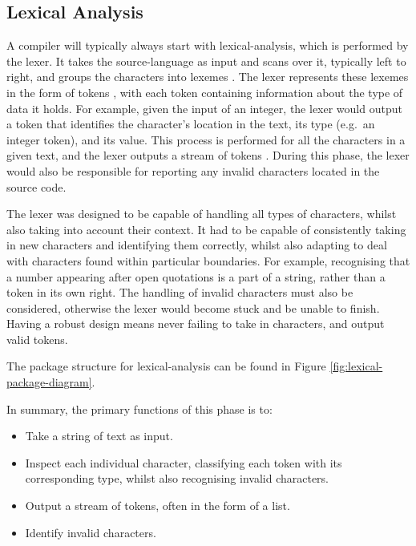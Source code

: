 \documentclass[
]{report}
\begin{document}
\subsection{Lexical Analysis}
A compiler will typically always start with \gls{lexical-analysis}, which is
performed by the lexer. It takes the \gls{source-language} as input and scans over
it, typically left to right, and groups the characters into \glspl{lexeme}
\cite{guru99-website}. The lexer represents these \glspl{lexeme} in the form of \glspl{token}
\cite{tutorials-guide}, with each \gls{token} containing information about the type of data
it holds. For example, given the input of an integer, the lexer would
output a \gls{token} that identifies the character's location in the text, its
type (e.g.~an integer \gls{token}), and its value. This process is performed
for all the characters in a given text, and the lexer outputs a stream
of \glspl{token} \cite{kttpro-website}. During this phase, the lexer would also be
responsible for reporting any invalid characters located in the source
code.

The lexer was designed to be capable of handling all types of
characters, whilst also taking into account their context. It had to be
capable of consistently taking in new characters and identifying them
correctly, whilst also adapting to deal with characters found within
particular boundaries. For example, recognising that a number appearing
after open quotations is a part of a string, rather than a \gls{token} in its own
right. The handling of invalid characters must also be considered,
otherwise the lexer would become stuck and be unable to finish.
Having a robust design means never failing to take in characters, and
output valid \glspl{token}.

The package structure for \gls{lexical-analysis} can be found in Figure \ref{fig:lexical-package-diagram}.

In summary, the primary functions of this phase is to:
\begin{itemize}
	\item Take a string of text as input. 
	\item Inspect each individual character, classifying each \gls{token} with its corresponding type, whilst also recognising invalid characters. 
	\item Output a stream of \glspl{token}, often in the form of a list.
	\item Identify invalid characters.
\end{itemize}
\end{document}
